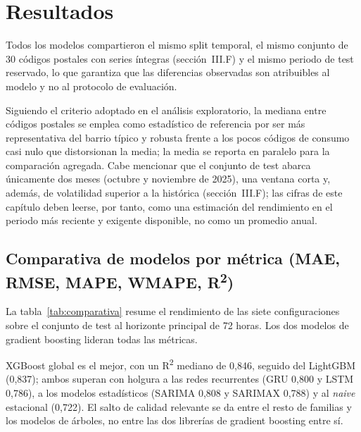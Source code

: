 \documentclass[12pt, a4paper]{article}
\begin{document}
\section{Resultados}

Todos los modelos compartieron el mismo split temporal, el mismo conjunto de 30 códigos postales con series íntegras (sección~III.F) y el mismo periodo de test reservado, lo que garantiza que las diferencias observadas son atribuibles al modelo y no al protocolo de evaluación. 

Siguiendo el criterio adoptado en el análisis exploratorio, la mediana entre códigos postales se emplea como estadístico de referencia por ser más representativa del barrio típico y robusta frente a los pocos códigos de consumo casi nulo que distorsionan la media; la media se reporta en paralelo para la comparación agregada. Cabe mencionar que el conjunto de test abarca únicamente dos meses (octubre y noviembre de 2025), una ventana corta y, además, de volatilidad superior a la histórica (sección~III.F); las cifras de este capítulo deben leerse, por tanto, como una estimación del rendimiento en el periodo más reciente y exigente disponible, no como un promedio anual.

\subsection{Comparativa de modelos por métrica (MAE, RMSE, MAPE, WMAPE, R\textsuperscript{2})}

La tabla~\ref{tab:comparativa} resume el rendimiento de las siete configuraciones sobre el conjunto de test al horizonte principal de 72 horas. Los dos modelos de gradient boosting lideran todas las métricas.

XGBoost global es el mejor, con un R\textsuperscript{2} mediano de 0,846, seguido del LightGBM (0,837); ambos superan con holgura a las redes recurrentes (GRU 0,800 y LSTM 0,786), a los modelos estadísticos (SARIMA 0,808 y SARIMAX 0,788) y al \textit{naive} estacional (0,722). El salto de calidad relevante se da entre el resto de familias y los modelos de árboles, no entre las dos librerías de gradient boosting entre sí.
\end{document}
